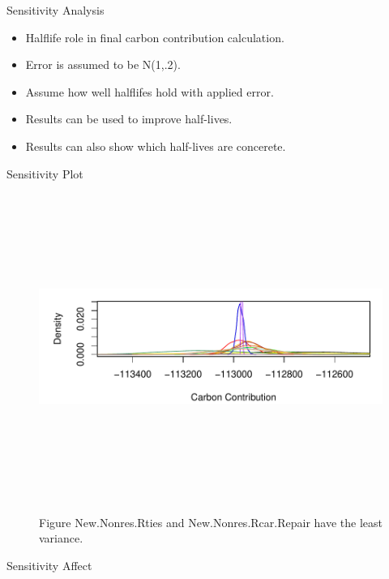 \documentclass[final]{beamer}\usepackage[]{graphicx}\usepackage[]{color}
\newlength{\onecolwid}
\begin{document}
\begin{frame}[t]
\begin{columns}[t]
\begin{column}{\onecolwid}
\begin{block}{Sensitivity Analysis}
\begin{itemize}
\item Halflife role in final carbon contribution calculation.
\item Error is assumed to be N(1,.2). 
\item Assume how well halflifes hold with applied error.
\item Results can be used to improve half-lives.
\item Results can also show which half-lives are concerete.
\end{itemize}
\vspace{0ex}

\end{block}

\begin{block}{Sensitivity Plot}
\begin{center}
\vspace{-2cm}
\begin{figure}
    {\includegraphics[width=1\linewidth,height=10cm]{CopyOfHLSensitivityGraph1.pdf}}
    \caption{Figure New.Nonres.Rties and New.Nonres.Rcar.Repair have the least variance.}
\end{figure}
\end{center}
\end{block}

\begin{block}{Sensitivity Affect}
\begin{center}


\end{center}
\end{block}
\end{column}
\end{columns}
\end{frame}
\end{document}
